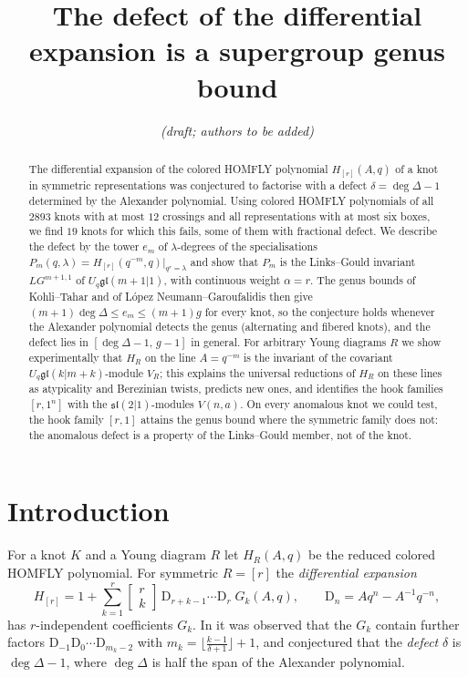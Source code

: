 \documentclass[11pt]{article}
\title{The defect of the differential expansion is a supergroup genus bound}
\author{\emph{(draft; authors to be added)}}
\date{}
\theoremstyle{definition}
\theoremstyle{remark}
\newcommand{\D}{\mathrm{D}}
\newcommand{\qbin}[2]{\left[\begin{smallmatrix}#1\\#2\end{smallmatrix}\right]}
\newcommand{\gl}{\mathfrak{gl}}
\begin{document}
\maketitle

\begin{abstract}
The differential expansion of the colored HOMFLY polynomial $H_{[r]}(A,q)$ of a knot in symmetric
representations was conjectured to factorise with a defect $\delta=\deg\Delta-1$ determined by the Alexander
polynomial.  Using colored HOMFLY polynomials of all $2893$ knots with at most $12$ crossings and all
representations with at most six boxes, we find $19$ knots for which this fails, some of them with fractional
defect.  We describe the defect by the tower $e_m$ of $\lambda$-degrees of the specialisations
$P_m(q,\lambda)=H_{[r]}(q^{-m},q)|_{q^r=\lambda}$ and show that $P_m$ is the Links--Gould invariant
$LG^{m+1,1}$ of $U_q\gl(m+1|1)$, with continuous weight $\alpha=r$.  The genus bounds of Kohli--Tahar and of
L\'opez Neumann--Garoufalidis then give $(m+1)\deg\Delta\le e_m\le(m+1)g$ for every knot, so the conjecture holds
whenever the Alexander polynomial detects the genus (alternating and fibered knots), and the defect lies in
$[\deg\Delta-1,\,g-1]$ in general.  For arbitrary Young diagrams $R$ we show experimentally that $H_R$ on the line
$A=q^{-m}$ is the invariant of the covariant $U_q\gl(k|m+k)$-module $V_R$; this explains the universal reductions of
$H_R$ on these lines as atypicality and Berezinian twists, predicts new ones, and identifies the hook families
$[r,1^n]$ with the $\mathfrak{sl}(2|1)$-modules $V(n,a)$.  On every anomalous knot we could test, the hook family
$[r,1]$ attains the genus bound where the symmetric family does not: the anomalous defect is a property of the
Links--Gould member, not of the knot.
\end{abstract}

\tableofcontents

\section{Introduction}

For a knot $K$ and a Young diagram $R$ let $H_R(A,q)$ be the reduced colored HOMFLY polynomial.  For symmetric
$R=[r]$ the \emph{differential expansion}
\begin{equation}\label{DE}
  H_{[r]}=1+\sum_{k=1}^{r}\qbin{r}{k}\,\D_{r+k-1}\cdots\D_{r}\;G_k(A,q),\qquad \D_n=Aq^n-A^{-1}q^{-n},
\end{equation}
has $r$-independent coefficients $G_k$.  In \cite{KM-defect} it was observed that the $G_k$ contain further
factors $\D_{-1}\D_0\cdots\D_{m_k-2}$ with $m_k=\lfloor\frac{k-1}{\delta+1}\rfloor+1$, and conjectured that the
\emph{defect} $\delta$ is $\deg\Delta-1$, where $\deg\Delta$ is half the span of the Alexander polynomial.
\end{document}
